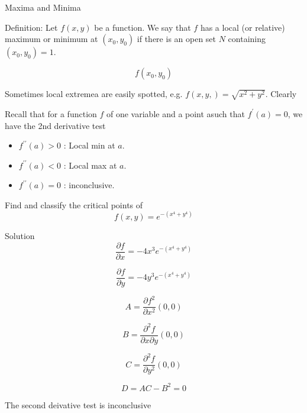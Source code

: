 Maxima and Minima

Definition: Let $f(x,y)$ be a function. We say that $f$ has a local (or relative) maximum or minimum at $(x_0,y_0)$ if there is an open set $N$ containing $(x_0,y_0) = 1$.

\[ f(x_0,y_0) \]



Sometimes local extremea are easily spotted, e.g. $f(x,y,) = \sqrt{x^2 + y^2}$. Clearly




Recall that for a function $f$ of one variable and a point asuch that $f^{\prime}(a) =0 $, we have
the 2nd derivative test

\begin{itemize}
\item $f^{\prime\prime}(a) > 0 $ : Local min at $a$.
\item $f^{\prime\prime}(a) < 0 $ : Local max at $a$.
\item $f^{\prime\prime}(a) = 0 $ : inconclusive. 
\end{itemize}


Find and classify the critical points of 
\[f(x,y) = e^{-(x^4 + y^4)}\]

Solution
\[ \frac{ \partial f}{ \partial x}  =  -4x^3 e^{-(x^4 + y^4)} \]

\[ \frac{ \partial f}{ \partial y}  =  -4y^3 e^{-(x^4 + y^4)} \]

\[ A = \frac{ \partial f^2}{ \partial x^2}(0,0) \]

\[ B = \frac{ \partial^2 f}{ \partial x \partial y}(0,0) \]

\[ C = \frac{ \partial^2 f}{ \partial y^2} (0,0)\]

\[D = AC-B^2 = 0\]

The second deivative test is inconclusive
